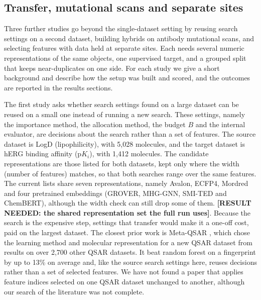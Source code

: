 \subsection{Transfer, mutational scans and separate sites}

Three further studies go beyond the single-dataset setting by reusing search settings on a second dataset, building hybrids on antibody mutational scans, and selecting features with data held at separate sites. Each needs several numeric representations of the same objects, one supervised target, and a grouped split that keeps near-duplicates on one side. For each study we give a short background and describe how the setup was built and scored, and the outcomes are reported in the results sections.

The first study asks whether search settings found on a large dataset can be reused on a small one instead of running a new search. These settings, namely the importance method, the allocation method, the budget $B$ and the internal evaluator, are decisions about the search rather than a set of features. The source dataset is LogD (lipophilicity), with 5,028 molecules, and the target dataset is hERG binding affinity ($\mathrm{p}K_i$), with 1,412 molecules. The candidate representations are those listed for both datasets, kept only where the width (number of features) matches, so that both searches range over the same features. The current lists share seven representations, namely Avalon, ECFP4, Mordred and four pretrained embeddings (GROVER, MHG-GNN, SMI-TED and ChemBERT), although the width check can still drop some of them. \textbf{[RESULT NEEDED: the shared representation set the full run uses]}. Because the search is the expensive step, settings that transfer would make it a one-off cost, paid on the largest dataset. The closest prior work is Meta-QSAR \citep{Olier2018}, which chose the learning method and molecular representation for a new QSAR dataset from results on over 2,700 other QSAR datasets. It beat random forest on a fingerprint by up to 13\% on average and, like the source search settings here, reuses decisions rather than a set of selected features. We have not found a paper that applies feature indices selected on one QSAR dataset unchanged to another, although our search of the literature was not complete.

